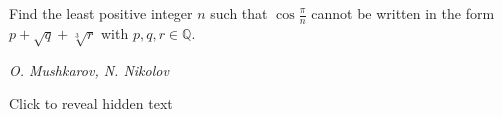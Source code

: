 Find the least positive integer $n$ such that $\cos\frac{\pi}{n}$ cannot be written in the form $p+\sqrt{q}+\sqrt[3]{r}$ with $p,q,r\in\mathbb{Q}$.

\textit{O. Mushkarov, N. Nikolov}

Click to reveal hidden text